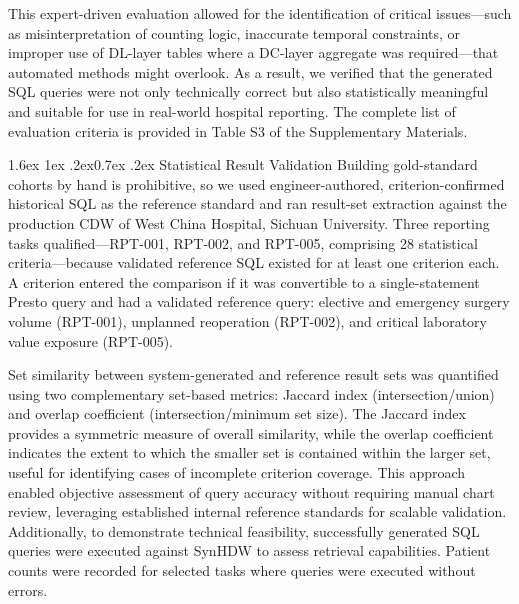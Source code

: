 \documentclass[10pt]{article}
\makeatletter
\renewcommand\subsubsection{\@startsection{subsubsection}{3}{\z@}%
  {1.6ex \@plus 1ex \@minus .2ex}{0.7ex \@plus .2ex}%
  {\normalfont\normalsize\itshape}}
\makeatother
\begin{document}
This expert-driven evaluation allowed for the identification of critical
issues---such as misinterpretation of counting logic, inaccurate temporal
constraints, or improper use of DL-layer tables where a DC-layer aggregate was
required---that automated methods might overlook. As a result, we verified that
the generated SQL queries were not only technically correct but also
statistically meaningful and suitable for use in real-world hospital reporting.
The complete list of evaluation criteria is provided in Table S3 of the
Supplementary Materials.

\subsubsection{Statistical Result Validation}
Building gold-standard cohorts by hand is prohibitive, so we used engineer-authored, criterion-confirmed historical SQL as the reference standard and ran result-set extraction against the production CDW of West China Hospital, Sichuan University. Three reporting tasks qualified---RPT-001, RPT-002, and RPT-005, comprising 28 statistical criteria---because validated reference SQL existed for at least one criterion each. A criterion entered the comparison if it was convertible to a single-statement Presto query and had a validated reference query: elective and emergency surgery volume (RPT-001), unplanned reoperation (RPT-002), and critical laboratory value exposure (RPT-005).

Set similarity between system-generated and reference result sets was quantified
using two complementary set-based metrics: Jaccard index (intersection/union)
and overlap coefficient (intersection/minimum set size). The Jaccard index
provides a symmetric measure of overall similarity, while the overlap
coefficient indicates the extent to which the smaller set is contained within
the larger set, useful for identifying cases of incomplete criterion coverage.
This approach enabled objective assessment of query accuracy without requiring
manual chart review, leveraging established internal reference standards for
scalable validation. Additionally, to demonstrate technical feasibility,
successfully generated SQL queries were executed against SynHDW to assess
retrieval capabilities. Patient counts were recorded for selected tasks where
queries were executed without errors.
\end{document}
